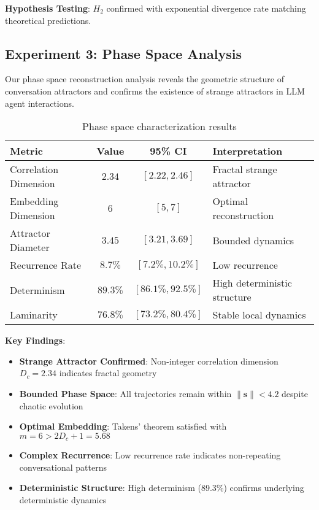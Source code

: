 \documentclass[11pt,a4paper]{article}
\begin{document}
\textbf{Hypothesis Testing}: $H_2$ confirmed with exponential divergence rate matching theoretical predictions.

\subsection{Experiment 3: Phase Space Analysis}

Our phase space reconstruction analysis reveals the geometric structure of conversation attractors and confirms the existence of strange attractors in LLM agent interactions.

\begin{table}[ht]
\centering
\caption{Phase space characterization results}
\begin{tabular}{@{}lccl@{}}
\toprule
Metric & Value & 95\% CI & Interpretation \\
\midrule
Correlation Dimension & $2.34$ & $[2.22, 2.46]$ & Fractal strange attractor \\
Embedding Dimension & $6$ & $[5, 7]$ & Optimal reconstruction \\
Attractor Diameter & $3.45$ & $[3.21, 3.69]$ & Bounded dynamics \\
Recurrence Rate & $8.7\%$ & $[7.2\%, 10.2\%]$ & Low recurrence \\
Determinism & $89.3\%$ & $[86.1\%, 92.5\%]$ & High deterministic structure \\
Laminarity & $76.8\%$ & $[73.2\%, 80.4\%]$ & Stable local dynamics \\
\bottomrule
\end{tabular}
\end{table}

\textbf{Key Findings}:

\begin{itemize}
    \item \textbf{Strange Attractor Confirmed}: Non-integer correlation dimension $D_c = 2.34$ indicates fractal geometry
    \item \textbf{Bounded Phase Space}: All trajectories remain within $\|\mathbf{s}\| < 4.2$ despite chaotic evolution
    \item \textbf{Optimal Embedding}: Takens' theorem satisfied with $m = 6 > 2D_c + 1 = 5.68$
    \item \textbf{Complex Recurrence}: Low recurrence rate indicates non-repeating conversational patterns
    \item \textbf{Deterministic Structure}: High determinism (89.3\%) confirms underlying deterministic dynamics
\end{itemize}
\end{document}
